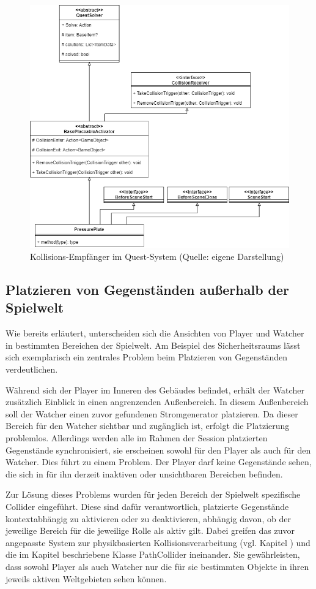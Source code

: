 \begin{figure}[ht]
\centering
\includegraphics[width=0.8\linewidth]{content/pictures/Quest-Extension.drawio.png}
\caption{Kollisions-Empfänger im Quest-System (Quelle: eigene Darstellung)}
\label{fig:new-collision-system-in-quests}
\end{figure}

\subsection{Platzieren von Gegenständen außerhalb der Spielwelt}\label{sec:difficulties-placement}

Wie bereits erläutert, unterscheiden sich die Ansichten von Player und Watcher in bestimmten Bereichen der Spielwelt. Am Beispiel des Sicherheitsraums lässt sich exemplarisch ein zentrales Problem beim Platzieren von Gegenständen verdeutlichen.

Während sich der Player im Inneren des Gebäudes befindet, erhält der Watcher zusätzlich Einblick in einen angrenzenden Außenbereich. In diesem Außenbereich soll der Watcher einen zuvor gefundenen Stromgenerator platzieren. Da dieser Bereich für den Watcher sichtbar und zugänglich ist, erfolgt die Platzierung problemlos. Allerdings werden alle im Rahmen der Session platzierten Gegenstände synchronisiert, sie erscheinen sowohl für den Player als auch für den Watcher. Dies führt zu einem Problem. Der Player darf keine Gegenstände sehen, die sich in für ihn derzeit inaktiven oder unsichtbaren Bereichen befinden.

Zur Lösung dieses Problems wurden für jeden Bereich der Spielwelt spezifische Collider eingeführt. Diese sind dafür verantwortlich, platzierte Gegenstände kontextabhängig zu aktivieren oder zu deaktivieren, abhängig davon, ob der jeweilige Bereich für die jeweilige Rolle als aktiv gilt. Dabei greifen das zuvor angepasste System zur physikbasierten Kollisionsverarbeitung (vgl. Kapitel ) und die im Kapitel   beschriebene Klasse PathCollider ineinander. Sie gewährleisten, dass sowohl Player als auch Watcher nur die für sie bestimmten Objekte in ihren jeweils aktiven Weltgebieten sehen können.

